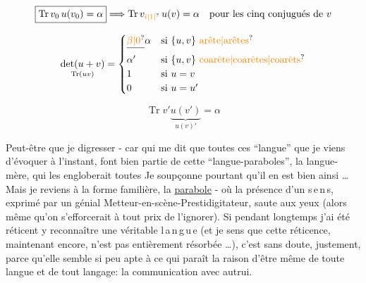 


\[
\boxed{\operatorname{Tr}v_0\,u(v_0)=\alpha}\Longrightarrow
\operatorname{Tr}v_{\unsure{i|1|{}}}\,u(v)=\alpha
\quad\text{pour les cinq conjugués de }v
\]

\[
\underset{\operatorname{Tr}(uv)}{\det(u+v)}=
\begin{cases}
\deleted{\unsure{\beta|0}}\alpha&\text{si }\{u,v\}\ \text{\unsure{arête|arêtes}}\\
\alpha'&\text{si }\{u,v\}\ \text{\unsure{coarête|coarêtes|coarêts}}\\
1&\text{si }u=v\\
0&\text{si }u=u'
\end{cases}
\]

\[
\operatorname{Tr}v'\underbrace{u(v')}_{u(v)'}=\alpha
\]


Peut-être que  je  digresser - car qui me dit que toutes ces ``langue'' que je viens d'évoquer à l'instant, font bien partie de cette ``langue-paraboles'', la langue-mère, qui les engloberait toutes Je soupçonne pourtant qu'il en est bien ainsi \ldots{} Mais je reviens à la forme familière, la \uline{parabole} -  où la présence d'un \mbox{s\,e\,n\,s}, exprimé par un génial Metteur-en-scène-Prestidigitateur, saute aux yeux (alors même qu'on s'efforcerait à tout prix de l'ignorer). Si pendant longtemps j'ai été réticent  y reconnaître une véritable \mbox{l\,a\,n\,g\,u\,e} (et je sens que cette réticence, maintenant encore, n'est pas entièrement résorbée \ldots), c'est sans doute, justement, parce qu'elle semble si peu apte à ce qui paraît la raison d'être même de toute langue et de tout langage: la communication avec autrui.

